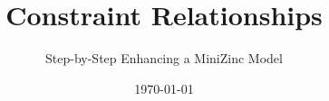 \documentclass[10pt,xcolor={dvipsnames},fleqn]{beamer}
\title{Constraint Relationships}
\author{Step-by-Step Enhancing a MiniZinc Model}
\date{\today}
\newcommand{\cemph}[1]{\alert{#1}}
\begin{document}
\titleframe

%
%
%
%
%
%
%
%
%
%
%
%
%
\end{document}
